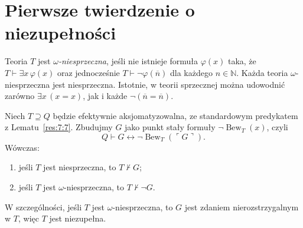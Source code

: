 \section{Pierwsze twierdzenie o niezupełności}\label{sec:pierwsze-twierdzenie}
\begin{definicja}\label{res:9:1}
Teoria $T$ jest \emph{$\omega$-niesprzeczna}, jeśli nie istnieje formuła $\varphi(x)$ taka, że $T\vdash\exists x\,\varphi(x)$ oraz jednocześnie $T\vdash\neg\varphi(\overline n)$ dla każdego $n\in\mathbb N$. Każda teoria $\omega$-niesprzeczna jest niesprzeczna. Istotnie, w teorii sprzecznej można udowodnić zarówno $\exists x\,(x=x)$, jak i każde $\neg(\overline n=\overline n)$.
\end{definicja}

\begin{twierdzenie}\label{res:9:2}
Niech $T\supseteq Q$ będzie efektywnie aksjomatyzowalna, ze standardowym predykatem z Lematu~\ref{res:7:7}. Zbudujmy $G$ jako punkt stały formuły $\neg\operatorname{Bew}_T(x)$, czyli
\begin{equation}\label{eq:9:1}
Q\vdash G\leftrightarrow\neg\operatorname{Bew}_T(\ulcorner G\urcorner).
\end{equation}
Wówczas:
\begin{enumerate}[label=(\alph*)]
\item jeśli $T$ jest niesprzeczna, to $T\nvdash G$;
\item jeśli $T$ jest $\omega$-niesprzeczna, to $T\nvdash\neg G$.
\end{enumerate}
W szczególności, jeśli $T$ jest $\omega$-niesprzeczna, to $G$ jest zdaniem nierozstrzygalnym w $T$, więc $T$ jest niezupełna.
\end{twierdzenie}
